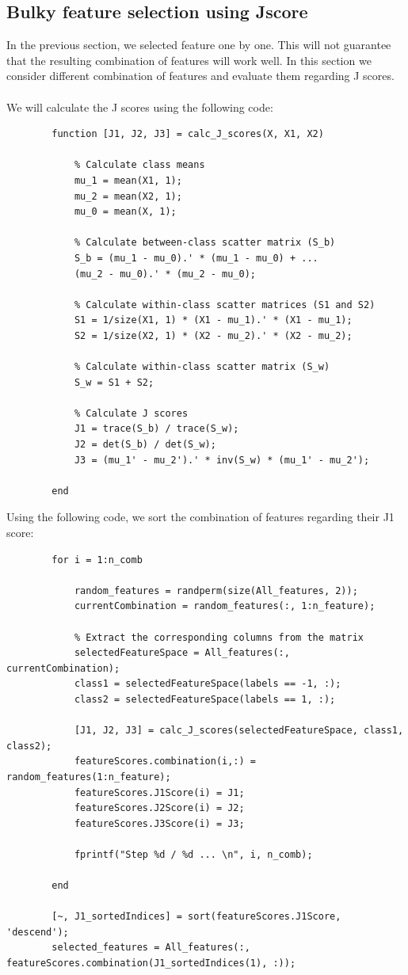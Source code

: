 \documentclass[]{article}
\begin{document}
	\subsection{Bulky feature selection using Jscore}
	In the previous section, we selected feature one by one. This will not guarantee that the resulting combination of features will work well. In this section we consider different combination of features and evaluate them regarding J scores.\\\\
	We will calculate the J scores using the following code:
	\begin{lstlisting}
		function [J1, J2, J3] = calc_J_scores(X, X1, X2)
			
			% Calculate class means
			mu_1 = mean(X1, 1);
			mu_2 = mean(X2, 1);
			mu_0 = mean(X, 1);
			
			% Calculate between-class scatter matrix (S_b)
			S_b = (mu_1 - mu_0).' * (mu_1 - mu_0) + ...
			(mu_2 - mu_0).' * (mu_2 - mu_0);
			
			% Calculate within-class scatter matrices (S1 and S2)
			S1 = 1/size(X1, 1) * (X1 - mu_1).' * (X1 - mu_1);
			S2 = 1/size(X2, 1) * (X2 - mu_2).' * (X2 - mu_2);
			
			% Calculate within-class scatter matrix (S_w)
			S_w = S1 + S2;
			
			% Calculate J scores
			J1 = trace(S_b) / trace(S_w);
			J2 = det(S_b) / det(S_w);
			J3 = (mu_1' - mu_2').' * inv(S_w) * (mu_1' - mu_2');
			
		end
	\end{lstlisting} 
	Using the following code, we sort the combination of features regarding their J1 score:
	\begin{lstlisting}
		for i = 1:n_comb
		
			random_features = randperm(size(All_features, 2));
			currentCombination = random_features(:, 1:n_feature);
			
			% Extract the corresponding columns from the matrix
			selectedFeatureSpace = All_features(:, currentCombination); 
			class1 = selectedFeatureSpace(labels == -1, :);
			class2 = selectedFeatureSpace(labels == 1, :);
			
			[J1, J2, J3] = calc_J_scores(selectedFeatureSpace, class1, class2);
			featureScores.combination(i,:) = random_features(1:n_feature);
			featureScores.J1Score(i) = J1;
			featureScores.J2Score(i) = J2;
			featureScores.J3Score(i) = J3;
			
			fprintf("Step %d / %d ... \n", i, n_comb);
			
		end
		
		[~, J1_sortedIndices] = sort(featureScores.J1Score, 'descend');
		selected_features = All_features(:, featureScores.combination(J1_sortedIndices(1), :));
	\end{lstlisting}
\end{document}
